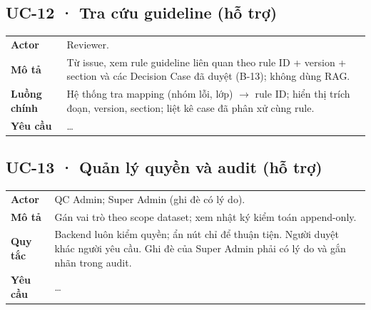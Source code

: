 \subsection*{UC-12 · Tra cứu guideline (hỗ trợ)}
\begin{xltabular}{\linewidth}{@{}>{\bfseries}L{3.2cm}Y@{}}
\toprule
Actor & Reviewer.\\
Mô tả & Từ issue, xem rule guideline liên quan theo rule ID + version + section và các Decision Case đã duyệt (B-13); không dùng RAG.\\
Luồng chính & Hệ thống tra mapping (nhóm lỗi, lớp) $\rightarrow$ rule ID; hiển thị trích đoạn, version, section; liệt kê case đã phân xử cùng rule.\\
Yêu cầu & …\\
\bottomrule
\end{xltabular}

\subsection*{UC-13 · Quản lý quyền và audit (hỗ trợ)}
\begin{xltabular}{\linewidth}{@{}>{\bfseries}L{3.2cm}Y@{}}
\toprule
Actor & QC Admin; Super Admin (ghi đè có lý do).\\
Mô tả & Gán vai trò theo scope dataset; xem nhật ký kiểm toán append-only.\\
Quy tắc & Backend luôn kiểm quyền; ẩn nút chỉ để thuận tiện. Người duyệt khác người yêu cầu. Ghi đè của Super Admin phải có lý do và gắn nhãn trong audit.\\
Yêu cầu & …\\
\bottomrule
\end{xltabular}

